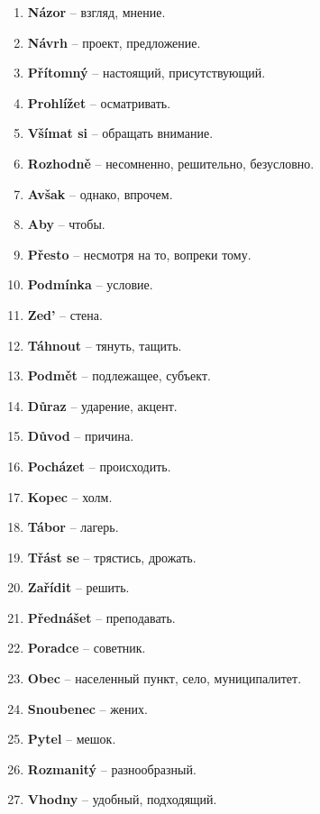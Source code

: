 \documentclass[12pt]{book}
\begin{document}
\begin{enumerate}
    \item \textbf{Názor} -- \textrussian{взгляд, мнение}.
    \item \textbf{Návrh} -- \textrussian{проект, предложение}.
    \item \textbf{Přítomný} -- \textrussian{настоящий, присутствующий}.
    \item \textbf{Prohlížet} -- \textrussian{осматривать}.
    \item \textbf{Všímat si} -- \textrussian{обращать внимание}.
    \item \textbf{Rozhodně} -- \textrussian{несомненно, решительно, безусловно}.
    \item \textbf{Avšak} -- \textrussian{однако, впрочем}.
    \item \textbf{Aby} -- \textrussian{чтобы}.
    \item \textbf{Přesto} -- \textrussian{несмотря на то, вопреки тому}.
    \item \textbf{Podmínka} -- \textrussian{условие}.
    \item \textbf{Zed'} -- \textrussian{стена}.
    \item \textbf{Táhnout} -- \textrussian{тянуть, тащить}.
    \item \textbf{Podmět} -- \textrussian{подлежащее, субъект}.
    \item \textbf{Důraz} -- \textrussian{ударение, акцент}.
    \item \textbf{Důvod} -- \textrussian{причина}.
    \item \textbf{Pocházet} -- \textrussian{происходить}.
    \item \textbf{Kopec} -- \textrussian{холм}.
    \item \textbf{Tábor} -- \textrussian{лагерь}.
    \item \textbf{Třást se} -- \textrussian{трястись, дрожать}.
    \item \textbf{Zařídit} -- \textrussian{решить}.
    \item \textbf{Přednášet} -- \textrussian{преподавать}.
    \item \textbf{Poradce} -- \textrussian{советник}.
    \item \textbf{Obec} -- \textrussian{населенный пункт, село, муниципалитет}.
    \item \textbf{Snoubenec} -- \textrussian{жених}.
    \item \textbf{Pytel} -- \textrussian{мешок}.
    \item \textbf{Rozmanitý} -- \textrussian{разнообразный}.
    \item \textbf{Vhodny} -- \textrussian{удобный, подходящий}.

\end{enumerate}
\end{document}
